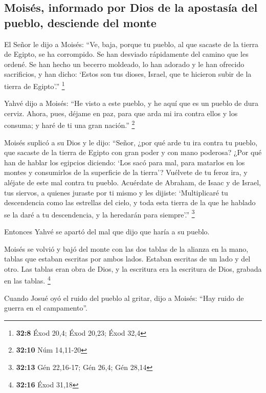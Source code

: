 \begin{paracol}{2}
\hypertarget{moisuxe9s-informado-por-dios-de-la-apostasuxeda-del-pueblo-desciende-del-monte}{%
\subsection{Moisés, informado por Dios de la apostasía del pueblo,
desciende del
monte}\label{moisuxe9s-informado-por-dios-de-la-apostasuxeda-del-pueblo-desciende-del-monte}}

 El Señor le dijo a Moisés: ``Ve, baja, porque tu pueblo,
al que sacaste de la tierra de Egipto, se ha corrompido. 
Se han desviado rápidamente del camino que les ordené. Se han hecho un
becerro moldeado, lo han adorado y le han ofrecido sacrificios, y han
dicho: `Estos son tus dioses, Israel, que te hicieron subir de la tierra
de Egipto'.'' \footnote{\textbf{32:8} Éxod 20,4; Éxod 20,23; Éxod 32,4}

 Yahvé dijo a Moisés: ``He visto a este pueblo, y he aquí
que es un pueblo de dura cerviz.  Ahora, pues, déjame en
paz, para que arda mi ira contra ellos y los consuma; y haré de ti una
gran nación.'' \footnote{\textbf{32:10} Núm 14,11-20}

 Moisés suplicó a su Dios y le dijo: ``Señor, ¿por qué
arde tu ira contra tu pueblo, que sacaste de la tierra de Egipto con
gran poder y con mano poderosa?  ¿Por qué han de hablar
los egipcios diciendo: `Los sacó para mal, para matarlos en los montes y
consumirlos de la superficie de la tierra'? Vuélvete de tu feroz ira, y
aléjate de este mal contra tu pueblo.  Acuérdate de
Abraham, de Isaac y de Israel, tus siervos, a quienes juraste por ti
mismo y les dijiste: `Multiplicaré tu descendencia como las estrellas
del cielo, y toda esta tierra de la que he hablado se la daré a tu
descendencia, y la heredarán para siempre'.'' \footnote{\textbf{32:13}
  Gén 22,16-17; Gén 26,4; Gén 28,14}

 Entonces Yahvé se apartó del mal que dijo que haría a su
pueblo.

 Moisés se volvió y bajó del monte con las dos tablas de
la alianza en la mano, tablas que estaban escritas por ambos lados.
Estaban escritas de un lado y del otro.  Las tablas eran
obra de Dios, y la escritura era la escritura de Dios, grabada en las
tablas. \footnote{\textbf{32:16} Éxod 31,18}

 Cuando Josué oyó el ruido del pueblo al gritar, dijo a
Moisés: ``Hay ruido de guerra en el campamento''.


\end{paracol}
